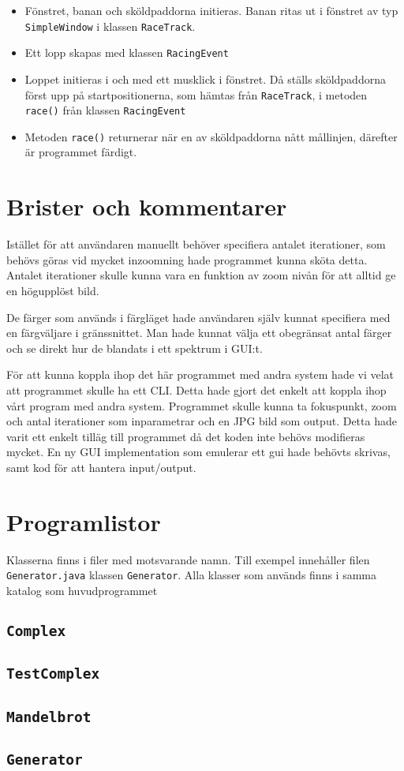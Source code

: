 \documentclass[a4paper]{article}
\newcommand{\code}[1]{\texttt{#1}} %
\begin{document}
\begin{itemize}
\item Fönstret, banan och sköldpaddorna initieras. Banan ritas ut i fönstret av typ \code{SimpleWindow} i klassen \code{RaceTrack}.
\item Ett lopp skapas med klassen \code{RacingEvent}
\item Loppet initieras i och med ett musklick i fönstret. Då ställs sköldpaddorna först upp på startpositionerna, som hämtas från \code{RaceTrack},  i metoden \code{race()} från klassen \code{RacingEvent}
\item Metoden \code{race()} returnerar när en av sköldpaddorna nått mållinjen, därefter är programmet färdigt. 
\end{itemize}

\section{Brister och kommentarer}
Istället för att användaren manuellt behöver specifiera antalet iterationer, som behövs göras vid mycket inzoomning hade programmet kunna sköta detta. Antalet iterationer skulle kunna vara en funktion av zoom nivån för att alltid ge en högupplöst bild.

De färger som används i färgläget hade användaren själv kunnat specifiera med en färgväljare i gränssnittet. Man hade kunnat välja ett obegränsat antal färger och se direkt hur de blandats i ett spektrum i GUI:t.

För att kunna koppla ihop det här programmet med andra system hade vi velat att programmet skulle ha ett CLI. Detta hade gjort det enkelt att koppla ihop vårt program med andra system. Programmet skulle kunna ta fokuspunkt, zoom och antal iterationer som inparametrar och en JPG bild som output. Detta hade varit ett enkelt tilläg till programmet då det koden inte behövs modifieras mycket. En ny GUI implementation som emulerar ett gui hade behövts skrivas, samt kod för att hantera input/output.


\section{Programlistor}
Klasserna finns i filer med motsvarande namn. Till exempel innehåller filen  \code{Generator.java} klassen \code{Generator}. Alla klasser som används finns i samma katalog som huvudprogrammet

\subsection{\code{Complex}}

\subsection{\code{TestComplex}}

\subsection{\code{Mandelbrot}}

\subsection{\code{Generator}}
\end{document}

